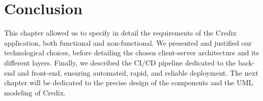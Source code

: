 \section*{Conclusion}

This chapter allowed us to specify in detail the requirements of the Credix application, both functional and non-functional. We presented and justified our technological choices, before detailing the chosen client-server architecture and its different layers. Finally, we described the CI/CD pipeline dedicated to the back-end and front-end, ensuring automated, rapid, and reliable deployment. The next chapter will be dedicated to the precise design of the components and the UML modeling of Credix.